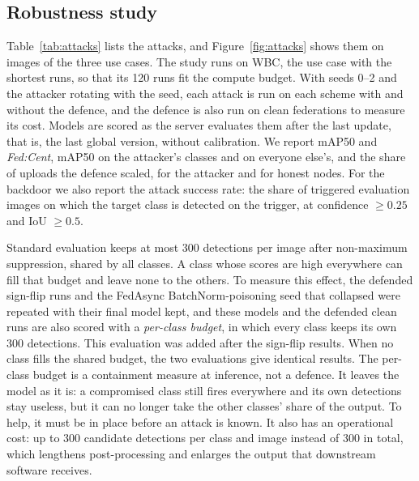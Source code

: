 \documentclass[pdflatex,sn-mathphys-num]{sn-jnl}
\newcommand{\fedcent}{\textit{Fed:Cent}}
\begin{document}
\subsection{Robustness study}\label{sec:robust-method}
Table~\ref{tab:attacks} lists the attacks, and Figure~\ref{fig:attacks} shows them on images of the three use cases. The study runs on WBC, the use case with the shortest runs, so that its 120 runs fit the compute budget. With seeds 0--2 and the attacker rotating with the seed, each attack is run on each scheme with and without the defence, and the defence is also run on clean federations to measure its cost. Models are scored as the server evaluates them after the last update, that is, the last global version, without calibration. We report mAP50 and \fedcent{}, mAP50 on the attacker's classes and on everyone else's, and the share of uploads the defence scaled, for the attacker and for honest nodes. For the backdoor we also report the attack success rate: the share of triggered evaluation images on which the target class is detected on the trigger, at confidence $\ge0.25$ and IoU $\ge0.5$.

Standard evaluation keeps at most 300 detections per image after non-maximum suppression, shared by all classes. A class whose scores are high everywhere can fill that budget and leave none to the others. To measure this effect, the defended sign-flip runs and the FedAsync BatchNorm-poisoning seed that collapsed were repeated with their final model kept, and these models and the defended clean runs are also scored with a \emph{per-class budget}, in which every class keeps its own 300 detections. This evaluation was added after the sign-flip results. When no class fills the shared budget, the two evaluations give identical results. The per-class budget is a containment measure at inference, not a defence. It leaves the model as it is: a compromised class still fires everywhere and its own detections stay useless, but it can no longer take the other classes' share of the output. To help, it must be in place before an attack is known. It also has an operational cost: up to 300 candidate detections per class and image instead of 300 in total, which lengthens post-processing and enlarges the output that downstream software receives.
\end{document}
